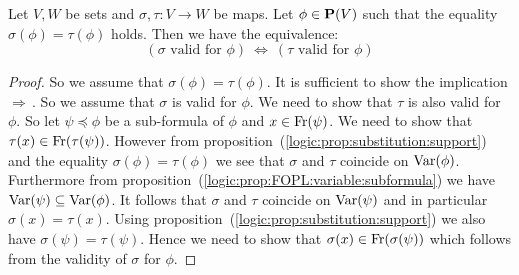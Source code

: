 \begin{prop}\label{logic:prop:FOPL:validsub:image}
Let $V,W$ be sets and $\sigma,\tau:V\to W$ be maps. Let $\phi\in\mbox{${\bf P}(V)$}$
such that the equality $\sigma(\phi)=\tau(\phi)$ holds. Then we have
the equivalence:
    \[
    (\mbox{$\sigma$ valid for $\phi$})\ \Leftrightarrow\
    (\mbox{$\tau$ valid for $\phi$})
    \]
\end{prop}
\begin{proof}
So we assume that $\sigma(\phi)=\tau(\phi)$. It is sufficient to
show the implication $\Rightarrow$\,. So we assume that $\sigma$ is
valid for $\phi$. We need to show that $\tau$ is also valid for
$\phi$. So let $\psi\preceq\phi$ be a sub-formula of $\phi$ and
$x\in\mbox{\rm Fr}(\psi)$. We need to show that
$\tau(x)\in\mbox{\rm Fr}(\tau(\psi))$. However from
proposition~(\ref{logic:prop:substitution:support}) and the equality
$\sigma(\phi)=\tau(\phi)$ we see that $\sigma$ and $\tau$ coincide
on $\mbox{\rm Var}(\phi)$. Furthermore from
proposition~(\ref{logic:prop:FOPL:variable:subformula}) we have
$\mbox{\rm Var}(\psi)\subseteq\mbox{\rm Var}(\phi)$. It follows that $\sigma$ and $\tau$
coincide on $\mbox{\rm Var}(\psi)$ and in particular $\sigma(x)=\tau(x)$.
Using proposition~(\ref{logic:prop:substitution:support}) we also
have $\sigma(\psi)=\tau(\psi)$. Hence we need to show that
$\sigma(x)\in\mbox{\rm Fr}(\sigma(\psi))$ which follows from the validity of
$\sigma$ for $\phi$.
\end{proof}

